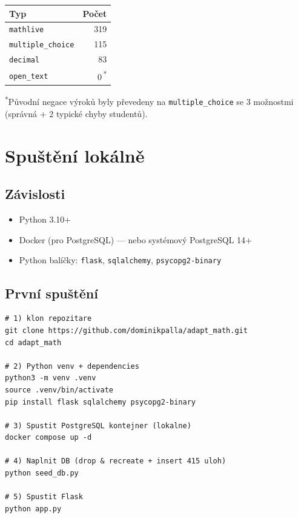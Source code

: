 \documentclass[11pt,a4paper]{article}
\begin{document}
\begin{tabular}{lr}
  \toprule
  \textbf{Typ} & \textbf{Počet} \\
  \midrule
  \texttt{mathlive}         & 319 \\
  \texttt{multiple\_choice} & 115 \\
  \texttt{decimal}          & \phantom{1}83 \\
  \texttt{open\_text}       & \phantom{11}0\,\textsuperscript{*} \\
  \bottomrule
\end{tabular}

\textsuperscript{*}{\small Původní negace výroků byly převedeny na \texttt{multiple\_choice} se 3 možnostmi (správná + 2 typické chyby studentů).}

\section{Spuštění lokálně}

\subsection{Závislosti}

\begin{itemize}
  \item Python 3.10+
  \item Docker (pro PostgreSQL) --- nebo systémový PostgreSQL 14+
  \item Python balíčky: \texttt{flask}, \texttt{sqlalchemy}, \texttt{psycopg2-binary}
\end{itemize}

\subsection{První spuštění}

\begin{lstlisting}[style=shell]
# 1) klon repozitare
git clone https://github.com/dominikpalla/adapt_math.git
cd adapt_math

# 2) Python venv + dependencies
python3 -m venv .venv
source .venv/bin/activate
pip install flask sqlalchemy psycopg2-binary

# 3) Spustit PostgreSQL kontejner (lokalne)
docker compose up -d

# 4) Naplnit DB (drop & recreate + insert 415 uloh)
python seed_db.py

# 5) Spustit Flask
python app.py
\end{lstlisting}
\end{document}
